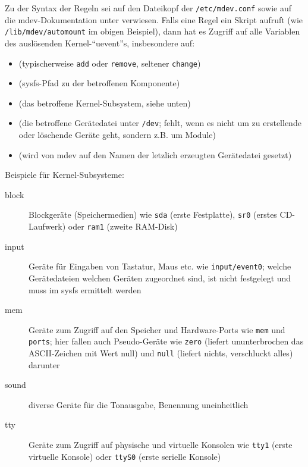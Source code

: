 Zu der Syntax der Regeln sei auf den Dateikopf der \texttt{/etc/mdev.conf}
sowie auf die mdev-Dokumentation unter
 verwiesen. Falls
eine Regel ein Skript aufruft (wie \texttt{/lib/mdev/automount} im obigen
Beispiel), dann hat es Zugriff auf alle Variablen des auslösenden
Kernel-``uevent''s, insbesondere auf:

\begin{itemize}
\item {} (typischerweise \texttt{add} oder \texttt{remove}, seltener
\texttt{change})
\item {} (sysfs-Pfad zu der betroffenen Komponente)
\item {} (das betroffene Kernel-Subsystem, siehe unten)
\item {} (die betroffene Gerätedatei unter \texttt{/dev}; fehlt, wenn
es nicht um zu erstellende oder löschende Geräte geht, sondern z.B. um Module)
\item {} (wird von mdev auf den Namen der letzlich erzeugten Gerätedatei
gesetzt)
\end{itemize}

Beispiele für Kernel-Subsysteme:

\begin{description}
\item[block] Blockgeräte (Speichermedien) wie \texttt{sda} (erste Festplatte),
             \texttt{sr0} (erstes CD-Laufwerk) oder \texttt{ram1} (zweite
             RAM-Disk)
\item[input] Geräte für Eingaben von Tastatur, Maus etc. wie
             \texttt{input/event0}; welche Gerätedateien welchen Geräten
             zugeordnet sind, ist nicht festgelegt und muss im sysfs ermittelt
             werden
\item[mem]   Geräte zum Zugriff auf den Speicher und Hardware-Ports wie
             \texttt{mem} und \texttt{ports}; hier fallen auch Pseudo-Geräte wie
             \texttt{zero} (liefert ununterbrochen das ASCII-Zeichen mit Wert
             null) und \texttt{null} (liefert nichts, verschluckt alles)
             darunter
\item[sound] diverse Geräte für die Tonausgabe, Benennung uneinheitlich
\item[tty]   Geräte zum Zugriff auf physische und virtuelle Konsolen wie
             \texttt{tty1} (erste virtuelle Konsole) oder \texttt{ttyS0} (erste
             serielle Konsole)
\end{description}

